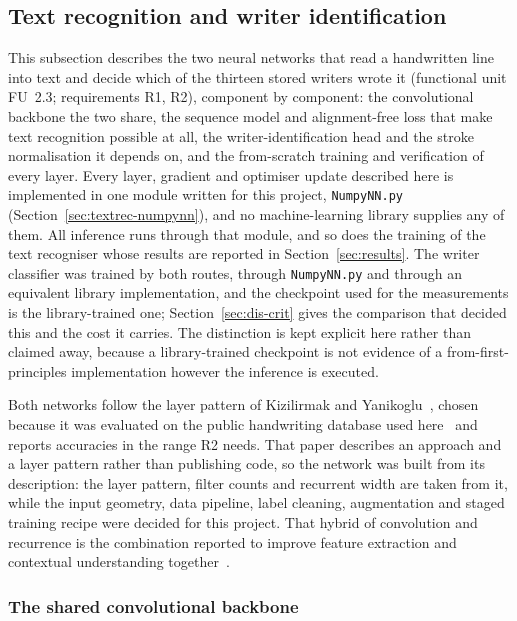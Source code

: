 \subsection{Text recognition and writer identification}
\label{sec:textrec}
\label{sec:writerid}

This subsection describes the two neural networks that read a handwritten line into text and decide which of the thirteen stored writers wrote it (functional unit FU~2.3; requirements R1, R2), component by component: the convolutional backbone the two share, the sequence model and alignment-free loss that make text recognition possible at all, the writer-identification head and the stroke normalisation it depends on, and the from-scratch training and verification of every layer. Every layer, gradient and optimiser update described here is implemented in one module written for this project, \texttt{NumpyNN.py} (Section~\ref{sec:textrec-numpynn}), and no machine-learning library supplies any of them. All inference runs through that module, and so does the training of the text recogniser whose results are reported in Section~\ref{sec:results}. The writer classifier was trained by both routes, through \texttt{NumpyNN.py} and through an equivalent library implementation, and the checkpoint used for the measurements is the library-trained one; Section~\ref{sec:dis-crit} gives the comparison that decided this and the cost it carries. The distinction is kept explicit here rather than claimed away, because a library-trained checkpoint is not evidence of a from-first-principles implementation however the inference is executed.

Both networks follow the layer pattern of Kizilirmak and Yanikoglu~\cite[p.~9]{kizilirmak2023}, chosen because it was evaluated on the public handwriting database used here~\cite{marti2002} and reports accuracies in the range R2 needs. That paper describes an approach and a layer pattern rather than publishing code, so the network was built from its description: the layer pattern, filter counts and recurrent width are taken from it, while the input geometry, data pipeline, label cleaning, augmentation and staged training recipe were decided for this project. That hybrid of convolution and recurrence is the combination reported to improve feature extraction and contextual understanding together~\cite{kumar2024,ma2023}.

\subsubsection{The shared convolutional backbone}
\label{sec:rec-backbone}

